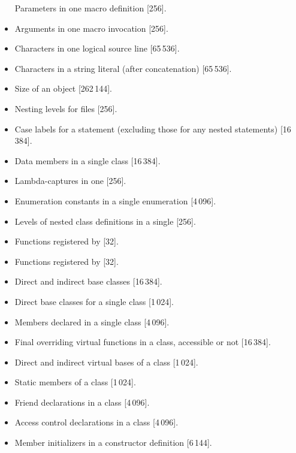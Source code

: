 \begin{itemize}
Parameters in one macro definition [256].
\item%
Arguments in one macro invocation [256].
\item%
Characters in one logical source line [65\,536].
\item%
Characters in a string literal
(after concatenation) [65\,536].
\item%
Size of an object [262\,144].
\item%
Nesting levels for
files [256].
\item%
Case labels for a
statement (excluding those for any nested
statements)
[16\,384].
\item%
Data members in a single class [16\,384].
\item%
Lambda-captures in one  [256].
\item%
Enumeration constants in a single enumeration [4\,096].
\item%
Levels of nested class definitions
in a single
[256].
\item%
Functions registered by
 [32].
\item%
Functions registered by
 [32].
\item%
Direct and indirect base classes [16\,384].
\item%
Direct base classes for a single class [1\,024].
\item%
Members declared in a single class [4\,096].
\item%
Final overriding virtual functions in a class,
accessible or not [16\,384].
\item%
Direct and indirect virtual bases of a class [1\,024].
\item%
Static members of a class [1\,024].
\item%
Friend declarations in a class [4\,096].
\item%
Access control declarations in a class [4\,096].
\item%
Member initializers in a constructor definition [6\,144].

\end{itemize}
